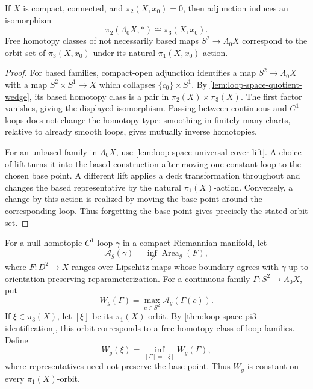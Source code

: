\begin{theorem}
\label{thm:loop-space-pi3-identification}
\notready
If $X$ is compact, connected, and $\pi_2(X,x_0)=0$, then adjunction induces
an isomorphism
\[
 \pi_2(\Lambda_0X,*)\cong\pi_3(X,x_0).
\]
Free homotopy classes of not necessarily based maps
$S^2\to\Lambda_0X$ correspond to the orbit set of $\pi_3(X,x_0)$ under its
natural $\pi_1(X,x_0)$-action.
\end{theorem}

\begin{proof}
For based families, compact-open adjunction identifies a map
$S^2\to\Lambda_0X$ with a map $S^2\times S^1\to X$ which collapses
$\{c_0\}\times S^1$.  By \ref{lem:loop-space-quotient-wedge}, its based
homotopy class is a pair in $\pi_2(X)\times\pi_3(X)$.  The first factor
vanishes, giving the displayed isomorphism.  Passing between continuous and
$C^1$ loops does not change the homotopy type: smoothing in finitely many
charts, relative to already smooth loops, gives mutually inverse homotopies.

For an unbased family in $\Lambda_0X$, use
\ref{lem:loop-space-universal-cover-lift}.  A choice of lift turns it into the
based construction after moving one constant loop to the chosen base point.
A different lift applies a deck transformation throughout and changes the
based representative by the natural $\pi_1(X)$-action.  Conversely, a change
by this action is realized by moving the base point around the corresponding
loop.  Thus forgetting the base point gives precisely the stated orbit set.
\end{proof}

\begin{definition}
\label{def:loop-family-width}
\notready
For a null-homotopic $C^1$ loop $\gamma$ in a compact Riemannian manifold,
let
\[
 \mathcal A_g(\gamma)=\inf_F\operatorname{Area}_g(F),
\]
where $F\colon D^2\to X$ ranges over Lipschitz maps whose boundary agrees
with $\gamma$ up to orientation-preserving reparameterization.  For a
continuous family $\Gamma\colon S^2\to\Lambda_0X$, put
\[
 W_g(\Gamma)=\max_{c\in S^2}\mathcal A_g(\Gamma(c)).
\]
If $\xi\in\pi_3(X)$, let $[\xi]$ be its $\pi_1(X)$-orbit.  By
\ref{thm:loop-space-pi3-identification}, this orbit corresponds to a free
homotopy class of loop families.  Define
\[
 W_g(\xi)=\inf_{[\Gamma]=[\xi]}W_g(\Gamma),
\]
where representatives need not preserve the base point.  Thus $W_g$ is
constant on every $\pi_1(X)$-orbit.
\end{definition}

